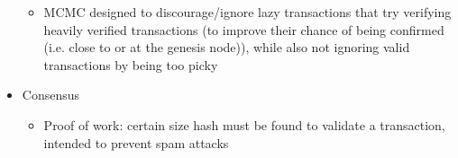\begin{itemize}
\begin{itemize}
		\item MCMC designed to discourage/ignore lazy transactions that try verifying heavily verified transactions (to improve their chance of being confirmed (i.e. close to or at the genesis node)), while also not ignoring valid transactions by being too picky
	\end{itemize}
	\item Consensus
	\begin{itemize}
		\item Proof of work: certain size hash must be found to validate a transaction, intended to prevent spam attacks
	\end{itemize}
\end{itemize}